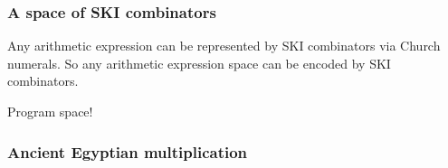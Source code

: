 \documentclass[aspectratio=169]{beamer}
\begin{document}
\begin{frame}
\frametitle{A space of SKI combinators}
    Any arithmetic expression can be represented by SKI combinators via Church numerals.
    So any arithmetic expression space can be encoded by SKI combinators.

    Program space!
\end{frame}

\begin{frame}
\frametitle{Ancient Egyptian multiplication}
    \begin{figure}[ht]\centering
    \end{figure}
\end{frame}
\end{document}
